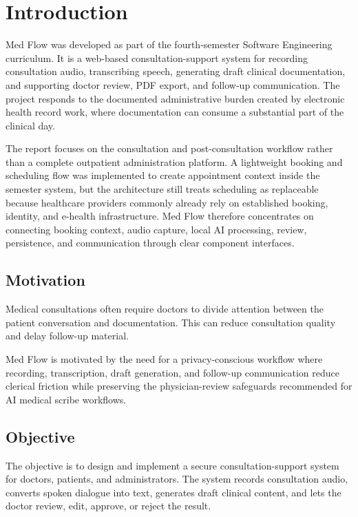 \section{Introduction}
\label{sec:introduction}

Med Flow was developed as part of the fourth-semester Software Engineering curriculum. It is a web-based consultation-support system for recording consultation audio, transcribing speech, generating draft clinical documentation, and supporting doctor review, PDF export, and follow-up communication. The project responds to the documented administrative burden created by electronic health record work, where documentation can consume a substantial part of the clinical day.

The report focuses on the consultation and post-consultation workflow rather than a complete outpatient administration platform. A lightweight booking and scheduling flow was implemented to create appointment context inside the semester system, but the architecture still treats scheduling as replaceable because healthcare providers commonly already rely on established booking, identity, and e-health infrastructure. Med Flow therefore concentrates on connecting booking context, audio capture, local AI processing, review, persistence, and communication through clear component interfaces.

\subsection{Motivation}
\label{subsec:motivation}

Medical consultations often require doctors to divide attention between the patient conversation and documentation. This can reduce consultation quality and delay follow-up material.

Med Flow is motivated by the need for a privacy-conscious workflow where recording, transcription, draft generation, and follow-up communication reduce clerical friction while preserving the physician-review safeguards recommended for AI medical scribe workflows.

\subsection{Objective}
\label{subsec:objective}

The objective is to design and implement a secure consultation-support system for doctors, patients, and administrators. The system records consultation audio, converts spoken dialogue into text, generates draft clinical content, and lets the doctor review, edit, approve, or reject the result.

